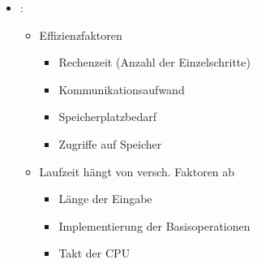 \documentclass[
    12pt,
    a4paper,
    ngerman,
    color=3b,%
    marginpar=false,
    colorback=false,
    leqno,
]{tudaexercise}
\begin{document}
\begin{itemize}
    \item {}:
          \begin{itemize}
              \item Effizienzfaktoren
                    \begin{itemize}
                        \item Rechenzeit (Anzahl der Einzelschritte)
                        \item Kommunikationsaufwand
                        \item Speicherplatzbedarf
                        \item Zugriffe auf Speicher
                    \end{itemize}
              \item Laufzeit hängt von versch. Faktoren ab
                    \begin{itemize}
                        \item Länge der Eingabe
                        \item Implementierung der Basisoperationen
                        \item Takt der CPU
                    \end{itemize}
          \end{itemize}

\end{itemize}
\clearpage
\end{document}
